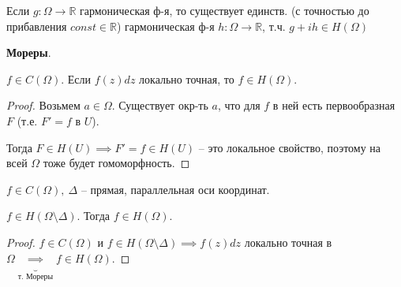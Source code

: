 \begin{remark}
    Если $g: \Omega \rightarrow \mathbb{R}$ гармоническая ф-я, то существует единств. (с точностью до прибавления $const \in \mathbb{R}$) гармоническая ф-я $h: \Omega \rightarrow \mathbb{R}$, т.ч. $g + i h \in H(\Omega)$
\end{remark}

\begin{theorem}
    \textbf{Мореры}.

    $f \in C(\Omega)$. Если $f(z) dz$ локально точная, то $f \in H(\Omega)$.
\end{theorem}
\begin{proof}
    Возьмем $a \in \Omega$. Существует окр-ть $a$, что для $f$ в ней есть первообразная $F$ (т.е. $F' = f$ в $U$). 
    
    Тогда $F \in H(U) \implies F' = f \in H(U)$ -- это локальное свойство, поэтому на всей $\Omega$ тоже будет гомоморфность.
\end{proof}

\begin{consequence}
    $f \in C(\Omega), \ \Delta$ -- прямая, параллельная оси координат.

    $f \in H(\Omega \setminus \Delta)$. Тогда $f \in H(\Omega)$.
\end{consequence}
\begin{proof}
    $f \in C(\Omega)$ и $f \in H(\Omega \setminus \Delta) \implies f(z) dz$ локально точная в $\Omega \underbrace{\implies}_{\text{т. Мореры}} f \in H(\Omega)$.
\end{proof}


